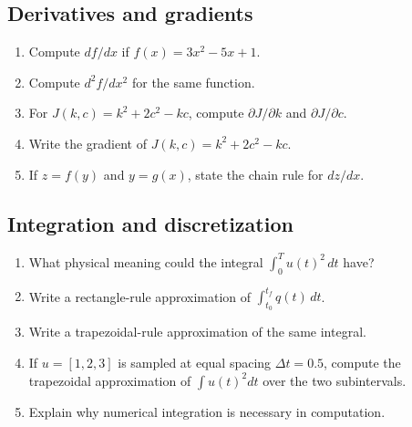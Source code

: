 \documentclass[11pt]{article}
\begin{document}
\subsection*{Derivatives and gradients}
\begin{enumerate}[leftmargin=1.5em,label=\textbf{P\arabic*.},resume]
  \item Compute $df/dx$ if $f(x)=3x^2-5x+1$.
  \item Compute $d^2f/dx^2$ for the same function.
  \item For $J(k,c)=k^2+2c^2-kc$, compute $\partial J/\partial k$ and $\partial J/\partial c$.
  \item Write the gradient of $J(k,c)=k^2+2c^2-kc$.
  \item If $z=f(y)$ and $y=g(x)$, state the chain rule for $dz/dx$.
\end{enumerate}

\subsection*{Integration and discretization}
\begin{enumerate}[leftmargin=1.5em,label=\textbf{P\arabic*.},resume]
  \item What physical meaning could the integral $\int_0^T u(t)^2\,dt$ have?
  \item Write a rectangle-rule approximation of $\int_{t_0}^{t_f} q(t)\,dt$.
  \item Write a trapezoidal-rule approximation of the same integral.
  \item If $u=[1,2,3]$ is sampled at equal spacing $\Delta t=0.5$, compute the trapezoidal approximation of $\int u(t)^2 dt$ over the two subintervals.
  \item Explain why numerical integration is necessary in computation.
\end{enumerate}
\end{document}
